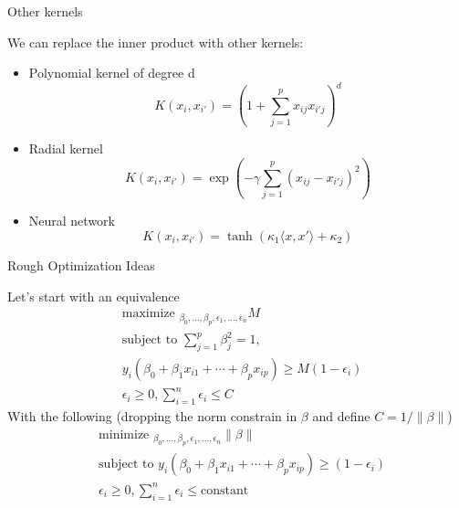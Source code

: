 \documentclass{beamer}
\begin{document}
\begin{frame}{Other kernels}
	
	
	We can replace the inner product with other kernels: 
	
	\begin{itemize}
		\item Polynomial kernel of degree d
		\begin{equation*}
			K(x_i,x_{i'})= (1 + \sum_{j=1}^p x_{ij}x_{i'j})^d
		\end{equation*}
	\item Radial kernel
	\begin{equation*}
K(x_i,x_{i'})= \exp \left( -\gamma \sum_{j=1}^p (x_{ij}-x_{i'j})^2 \right)
	\end{equation*}
\item Neural network
\begin{equation*}
	K(x_i,x_{i'})=\tanh (\kappa_1\langle x,x' \rangle + \kappa_2)
\end{equation*}
	\end{itemize}
\end{frame}

\begin{frame}{Rough Optimization Ideas}
	
	
	Let's start with an equivalence
		\begin{equation*}
		\begin{split}
			&\textrm{maximize }_{\beta_0,\ldots, \beta_p,\epsilon_1,\ldots,\epsilon_n} M \\
			&\textrm{subject to } \sum_{j=1}^p \beta_j^2 =1 , \\
			& y_i (\beta_0 + \beta_1 x_{i1}+ \cdots + \beta_p x_{ip} )\ge M (1-\epsilon_i) \\
			& \epsilon_i \ge 0, \sum_{i=1}^n \epsilon_i \le C 
		\end{split}
	\end{equation*}
With the following (dropping the norm constrain in $\beta$ and define $C=1/\| \beta \|$)
		\begin{equation}
		\begin{split}
			&\textrm{minimize }_{\beta_0,\ldots, \beta_p,\epsilon_1,\ldots,\epsilon_n} \| \beta \| \\
			&\textrm{subject to }  y_i (\beta_0 + \beta_1 x_{i1}+ \cdots + \beta_p x_{ip} )\ge  (1-\epsilon_i) \\
			& \epsilon_i \ge 0, \sum_{i=1}^n \epsilon_i \le \textrm{constant} 
		\end{split}
	\label{eq:optimization}
	\end{equation}
\end{frame}
\end{document}
